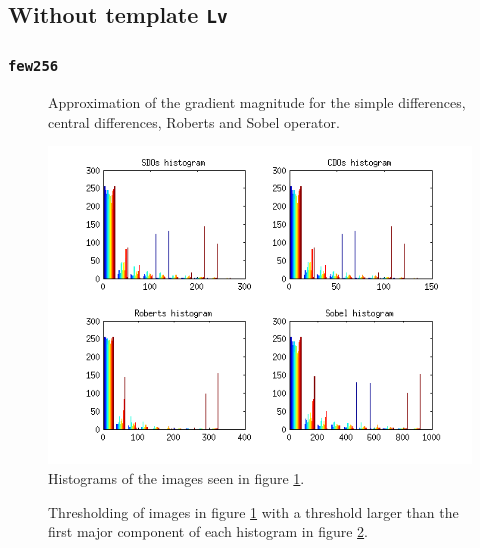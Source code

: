 \subsection{Without template \texttt{Lv}}
\subsubsection{\texttt{few256}}

\begin{figure}[H]
	\centering
	\scalebox{0.7}{}
	\caption{Approximation of the gradient magnitude for the simple differences, central differences, Roberts and Sobel operator.}
	\label{fig:Q2:2_tools}
\end{figure}

\begin{figure}[H]
	\centering
	\includegraphics[scale=0.8]{./images/Q2/tools/histogram_1.png}
	\caption{Histograms of the images seen in figure \ref{fig:Q2:2_tools}.}
	\label{fig:Q2:histogram_tools}
\end{figure}


\begin{figure}[H]
	\centering
	\scalebox{0.9}{}
	\caption{Thresholding of images in figure \ref{fig:Q2:2_tools} with a threshold larger than the first major component of 
	each histogram in figure \ref{fig:Q2:histogram_tools}.}
	\label{fig:Q2:threshold_tools_1}
\end{figure}

